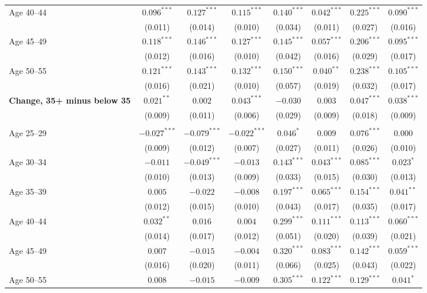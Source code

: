 \begin{table}[!htbp]
{{\begin{tabular}{lccccccc}
Age 40--44 & $0.096^{***}$ & $0.127^{***}$ & $0.115^{***}$ & $0.140^{***}$ & $0.042^{***}$ & $0.225^{***}$ & $0.090^{***}$ \\
 & (0.011) & (0.014) & (0.010) & (0.034) & (0.011) & (0.027) & (0.016) \\
Age 45--49 & $0.118^{***}$ & $0.146^{***}$ & $0.127^{***}$ & $0.145^{***}$ & $0.057^{***}$ & $0.206^{***}$ & $0.095^{***}$ \\
 & (0.012) & (0.016) & (0.010) & (0.042) & (0.016) & (0.029) & (0.017) \\
Age 50--55 & $0.121^{***}$ & $0.143^{***}$ & $0.132^{***}$ & $0.150^{***}$ & $0.040^{**}$ & $0.238^{***}$ & $0.105^{***}$ \\
 & (0.016) & (0.021) & (0.010) & (0.057) & (0.019) & (0.032) & (0.017) \\
\textbf{Change, 35+ minus below 35} & $0.021^{**}$ & $0.002$ & $0.043^{***}$ & $-0.030$ & $0.003$ & $0.047^{***}$ & $0.038^{***}$ \\
 & (0.009) & (0.011) & (0.006) & (0.029) & (0.009) & (0.018) & (0.009) \\
\addlinespace
\multicolumn{8}{l}{\textit{White $-$ Black}} \\
Age 25--29 & $-0.027^{***}$ & $-0.079^{***}$ & $-0.022^{***}$ & $0.046^{*}$ & $0.009$ & $0.076^{***}$ & $0.000$ \\
 & (0.009) & (0.012) & (0.007) & (0.027) & (0.011) & (0.026) & (0.010) \\
Age 30--34 & $-0.011$ & $-0.049^{***}$ & $-0.013$ & $0.143^{***}$ & $0.043^{***}$ & $0.085^{***}$ & $0.023^{*}$ \\
 & (0.010) & (0.013) & (0.009) & (0.033) & (0.015) & (0.030) & (0.013) \\
Age 35--39 & $0.005$ & $-0.022$ & $-0.008$ & $0.197^{***}$ & $0.065^{***}$ & $0.154^{***}$ & $0.041^{**}$ \\
 & (0.012) & (0.015) & (0.010) & (0.043) & (0.017) & (0.035) & (0.017) \\
Age 40--44 & $0.032^{**}$ & $0.016$ & $0.004$ & $0.299^{***}$ & $0.111^{***}$ & $0.113^{***}$ & $0.060^{***}$ \\
 & (0.014) & (0.017) & (0.012) & (0.051) & (0.020) & (0.039) & (0.021) \\
Age 45--49 & $0.007$ & $-0.015$ & $-0.004$ & $0.320^{***}$ & $0.083^{***}$ & $0.142^{***}$ & $0.059^{***}$ \\
 & (0.016) & (0.020) & (0.011) & (0.066) & (0.025) & (0.043) & (0.022) \\
Age 50--55 & $0.008$ & $-0.015$ & $-0.009$ & $0.305^{***}$ & $0.122^{***}$ & $0.129^{***}$ & $0.041^{*}$ \\

\end{tabular}}}
\end{table}
